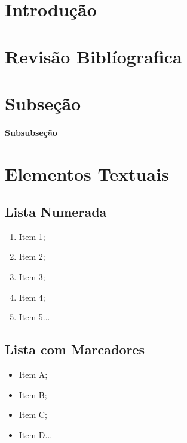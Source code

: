 \documentclass[12pt,openright,oneside,a4paper,english,french,spanish,brazil]{unifil}
\begin{document}
\chapter{Introdução}%



\chapter{Revisão Biblíografica}%


\chapter{Subseção}%


\subsubsection{Subsubseção}%




\chapter{Elementos Textuais}

\section{Lista Numerada}

\begin{enumerate}
 \item Item 1;
 \item Item 2;
 \item Item 3;
 \item Item 4;
 \item Item 5...
\end{enumerate}

\section{Lista com Marcadores}

\begin{itemize}
 \item Item A;
 \item Item B;
 \item Item C;
 \item Item D...
\end{itemize}
\cleardoublepage
\end{document}
